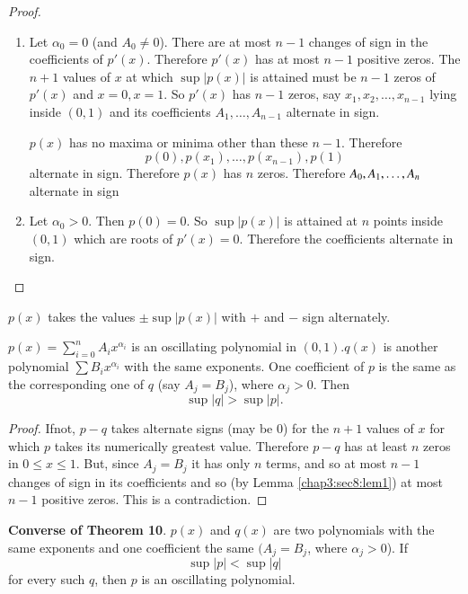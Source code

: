 \begin{proof}
  \begin{enumerate}[(1)]
  \item Let $\alpha_ 0=0$ (and $A_ 0\neq 0$). There are at most $n-1$
    changes of sign in the coefficients of $p'(x)$. Therefore $p'(x)$
    has at most $n-1$ positive zeros. The $n+1$ values of $x$ at which
    $\sup |p(x)|$ is attained must be $n-1$ zeros of $p'(x)$ and
    $x=0,x=1$. So $p'(x)$ has $n-1$ zeros, say $x_1,x_2, \ldots
   , x_{n-1}$ lying inside $(0,1)$ and its coefficients $A_1, \ldots
   , A_{n-1}$ alternate in sign. 
    
    $p(x)$ has no maxima or minima other than these $n-1$. Therefore
    $$
    p(0),p(x_1), \ldots, p(x_{n-1}),p(1)
    $$
    alternate in sign. Therefore $p(x)$ has $n$ zeros. Therefore $A_
    0, A_1, \ldots,\break A_n$ alternate in sign 
  \item Let $\alpha _ 0 >0$. Then $p(0)=0$. So $\sup |p(x)|$ is
    attained at $n$ points inside $(0,1)$ which are roots of
    $p'(x)=0$. Therefore the coefficients alternate in sign. 
  \end{enumerate}
\end{proof}

\begin{coro*}
  $p(x)$ takes the values $\pm \sup |p(x)|$ with $+$ and $-$ sign
  alternately. 
\end{coro*}

\begin{theorem}\label{chap3:sec8:thm10}%
  $p(x)=\sum \limits^n_{i= 0}A_i x ^{\alpha _i}$ is an
    oscillating polynomial in $(0,1).q(x)$ is another polynomial
    $\sum B_i x^{\alpha_i}$ with the same exponents. One coefficient
    of $p$ is the same as the corresponding one of $q$ (say
    $A_j=B_j$), where $\alpha_j >0$. Then 
    $$
    \sup |q|> \sup |p|.
    $$
\end{theorem}

\begin{proof}
  If\pageoriginale not, $p-q$ takes alternate signs (may be $0$) for the $n+1$
  values of $x$ for which $p$ takes its numerically greatest
  value. Therefore $p-q$ has at least $n$ zeros in $0 \leq x \leq
  1$. But, since $A_j=B_j$ it has only $n$ terms, and so at most $n-1$
  changes of sign in its coefficients and so (by Lemma \ref{chap3:sec8:lem1}) at most
  $n-1$ positive zeros. This is a contradiction. 
\end{proof}

\noindent
\textbf{Converse of Theorem 10}. $p(x)$ and $q(x)$ are two
polynomials with the same exponents and one coefficient the same
$(A_j=B_j$, where $\alpha _j >0$). If  
$$
\sup |p|< \sup |q|
$$
for every such $q$, then $p$ is an oscillating polynomial.

